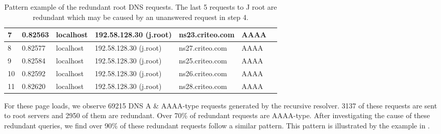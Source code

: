 \documentclass[sigconf,letterpaper,nonacm,10pt,anonymous]{acmart}
\begin{document}
\begin{table}[]
{\begin{tabular}{|l|l|l|l|l|l|l|}
7             & 0.82563                              & localhost             & 192.58.128.30 (j.root)         & ns23.criteo.com     & AAAA                &                                                                                                                                                \\ \hline
8             & 0.82577                              & localhost             & 192.58.128.30 (j.root)         & ns27.criteo.com     & AAAA                &                                                                                                                                                \\ \hline
9             & 0.82584                              & localhost             & 192.58.128.30 (j.root)         & ns25.criteo.com     & AAAA                &                                                                                                                                                \\ \hline
10            & 0.82592                              & localhost             & 192.58.128.30 (j.root)         & ns26.criteo.com     & AAAA                &                                                                                                                                                \\ \hline
11            & 0.82620                              & localhost             & 192.58.128.30 (j.root)         & ns28.criteo.com     & AAAA                &                                                                                                                                                \\ \hline
\end{tabular}%
}
\caption{Pattern example of the redundant root DNS requests. The last 5 requests to J root are redundant which may be caused by an unanswered request in step 4.}
\label{tab:redundant_example}
\end{table}

For these page loads, we observe 69215 DNS A \& AAAA-type requests
generated by the recursive resolver. 3137 of these requests are sent to
root servers and 2950 of them are redundant. Over 70\% of redundant
requests are AAAA-type. After investigating the cause of these redundant
queries, we find over 90\% of these redundant requests follow a similar
pattern. This pattern is illustrated by the example in
.
\end{document}
